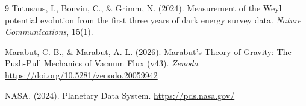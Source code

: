 \documentclass[11pt, a4paper]{article}
\begin{document}
\begin{thebibliography}{9}
  Tutusaus, I., Bonvin, C., \& Grimm, N. (2024). Measurement of the Weyl potential evolution from the first three years of dark energy survey data. \textit{Nature Communications}, 15(1).

  Marab\={u}t, C. B., \& Marab\={u}t, A. L. (2026). Marab\={u}t's Theory of Gravity: The Push-Pull Mechanics of Vacuum Flux (v43). \textit{Zenodo}. \url{https://doi.org/10.5281/zenodo.20059942}

  NASA. (2024). Planetary Data System. \url{https://pds.nasa.gov/}
\end{thebibliography}
\end{document}
